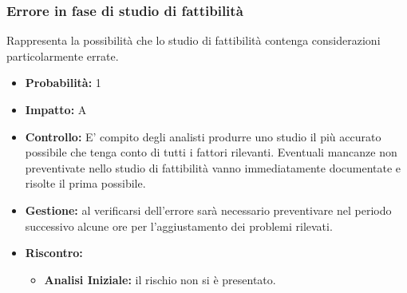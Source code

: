 \documentclass[a4paper,11pt]{article}
\begin{document}
		\subsubsection{Errore in fase di studio di fattibilità}
		Rappresenta la possibilità che lo studio di fattibilità contenga considerazioni particolarmente errate.
		\begin{itemize}
		\item \textbf{Probabilità:} 1
		\item \textbf{Impatto:} A
		\item \textbf{Controllo:} E' compito degli analisti produrre uno studio il più accurato possibile che tenga conto di tutti i fattori rilevanti. Eventuali mancanze non preventivate nello studio di fattibilità vanno immediatamente documentate e risolte il prima possibile.
		\item \textbf{Gestione:} al verificarsi dell'errore sarà necessario preventivare nel periodo successivo alcune ore per l'aggiustamento dei problemi rilevati.
		\item \textbf{Riscontro:}
			\begin{itemize}
				\item\textbf{Analisi Iniziale:} il rischio non si è presentato.
			\end{itemize}
		\end{itemize}
				
\end{document}
